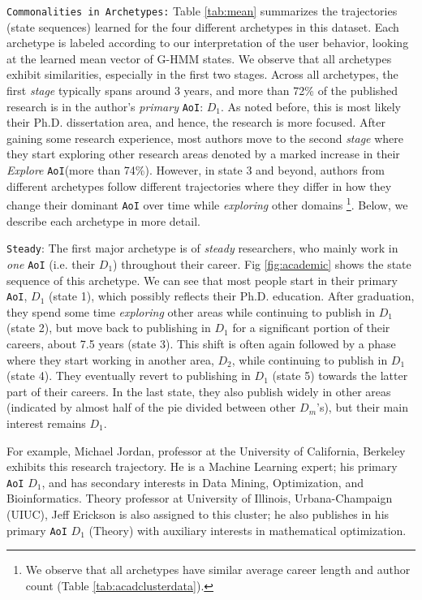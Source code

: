 \documentclass[10pt,letterpaper]{article}
\begin{document}
\texttt{Commonalities in Archetypes:} Table \ref{tab:mean} summarizes the trajectories (state sequences) learned for the four different archetypes in this dataset. Each archetype is labeled according to our interpretation of the user behavior, looking at the learned mean vector of G-HMM states. We observe that all archetypes exhibit similarities, especially in the first two stages. Across all archetypes, the first \emph{stage} typically spans around $3$ years, and more than 72\% of the published research is in the author's \emph{primary} \texttt{AoI}: $D_1$. As noted before, this is most likely their Ph.D. dissertation area, and hence, the research is more focused. After gaining some research experience, most authors move to the second \emph{stage} where they start exploring other research areas denoted by a marked increase in their \emph{Explore} \texttt{AoI}(more than 74\%). However, in state 3 and beyond, authors from different archetypes follow different trajectories where they differ in how they change their dominant \texttt{AoI} over time while \emph{exploring} other domains \footnote{We observe that all archetypes have similar
average career length and author count (Table \ref{tab:acadclusterdata}).}. Below, we describe each archetype in more detail.

\texttt{Steady}: The first major archetype is of \emph{steady} researchers, who mainly work in \emph{one} \texttt{AoI} (i.e. their $D_1$) throughout their career. Fig \ref{fig:academic} shows the state sequence of this archetype. We can see that most people start in their primary \texttt{AoI}, $D_1$ (state 1), which possibly reflects their Ph.D. education. After graduation, they spend some time \emph{exploring} other areas while continuing to publish in $D_1$ (state 2), but move back to publishing in $D_1$ for a significant portion of their careers, about 7.5 years (state 3). This shift is often again followed by a phase where they start working in another area, $D_2$, while continuing to publish in $D_1$ (state 4). They eventually revert to publishing in $D_1$ (state 5) towards the latter part of their careers. In the last state, they also publish widely in other areas (indicated by almost half of the pie divided between other $D_m$'s), but their main interest remains $D_1$.

For example, Michael Jordan, professor at the University of California, Berkeley exhibits this research trajectory. He is a Machine Learning expert; his primary \texttt{AoI} $D_1$, and has secondary interests in Data Mining, Optimization, and Bioinformatics.
Theory professor at University of Illinois, Urbana-Champaign (UIUC), Jeff Erickson is also assigned to this cluster; he also publishes in his primary \texttt{AoI} $D_1$ (Theory) with auxiliary interests in mathematical optimization.
\end{document}

